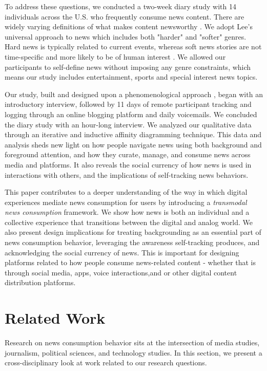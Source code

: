 \documentclass[sigchi]{acmart}
\begin{document}
To address these questions, we conducted a two-week diary study with 14 individuals across the U.S. who frequently consume news content. There are widely varying definitions of what makes content newsworthy \cite{harcup2001news}. We adopt Lee's \cite{lee2013news} universal approach to news which includes both "harder" and "softer" genres. Hard news is typically related to current events, whereas soft news stories are not time-specific and more likely to be of human interest \cite{tuchman1973making}. We allowed our participants to self-define news without imposing any genre constraints, which means our study includes entertainment, sports and special interest news topics. 

Our study, built and designed upon a phenomenological approach \cite{smith_flowers_larkin_2013}, began with an introductory interview, followed by 11 days of remote participant tracking and logging through an online blogging platform and daily voicemails. We concluded the diary study with an hour-long interview. We analyzed our qualitative data through an iterative and inductive affinity diagramming technique. This data and analysis sheds new light on how people navigate news using both background and foreground attention, and how they curate, manage, and consume news across media and platforms. It also reveals the social currency of how news is used in interactions with others, and the implications of self-tracking news behaviors. 

This paper contributes to a deeper understanding of the way in which digital experiences mediate news consumption for users by introducing a \textit{transmodal news consumption} framework. We show how news is both an individual and a collective experience that transitions between the digital and analog world. We also present design implications for treating backgrounding as an essential part of news consumption behavior, leveraging the awareness self-tracking produces, and acknowledging the social currency of news. This is important for designing platforms related to how people consume news-related content - whether that is through social media, apps, voice interactions,and or other digital content distribution platforms.

\section{Related Work}
Research on news consumption behavior sits at the intersection of media studies, journalism, political sciences, and technology studies. In this section, we present a cross-disciplinary look at work related to our research questions. 
\end{document}
